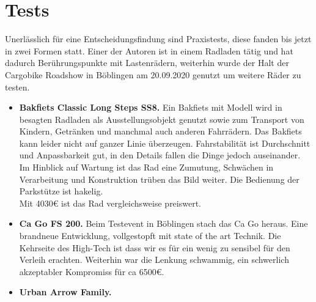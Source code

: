 \documentclass[a4paper,ngerman, 14pt] {scrartcl}
\begin{document}
\section{Tests}
Unerlässlich für eine Entscheidungsfindung sind Praxistests, diese fanden bis jetzt in zwei Formen statt. Einer der Autoren ist in einem Radladen tätig und hat dadurch Berührungspunkte mit Lastenrädern, weiterhin wurde der Halt der Cargobike Roadshow in Böblingen am 20.09.2020 genutzt um weitere Räder zu testen.
\begin{itemize}
    \item \textbf{Bakfiets Classic Long Steps SS8.} Ein Bakfiets mit Modell wird in besagten Radladen als Ausstellungsobjekt genutzt sowie zum Transport von Kindern, Getränken und manchmal auch anderen Fahrrädern. Das Bakfiets kann leider nicht auf ganzer Linie überzeugen. Fahrstabilität ist Durchschnitt und Anpassbarkeit gut, in den Details fallen die Dinge jedoch auseinander. Im Hinblick auf Wartung ist das Rad eine Zumutung, Schwächen in Verarbeitung und Konstruktion trüben das Bild weiter. Die Bedienung der Parkstütze ist hakelig.\\ Mit 4030€ ist das Rad vergleichsweise preiswert.
    \item \textbf{Ca Go FS 200.} Beim Testevent in Böblingen stach das Ca Go heraus. Eine brandneue Entwicklung, vollgestopft mit state of the art Technik. Die Kehrseite des High-Tech ist dass wir es für ein wenig zu sensibel für den Verleih erachten. Weiterhin war die Lenkung schwammig, ein schwerlich akzeptabler Kompromiss für ca 6500€.
    \item \textbf{Urban Arrow Family.}
\end{itemize}
\end{document}
